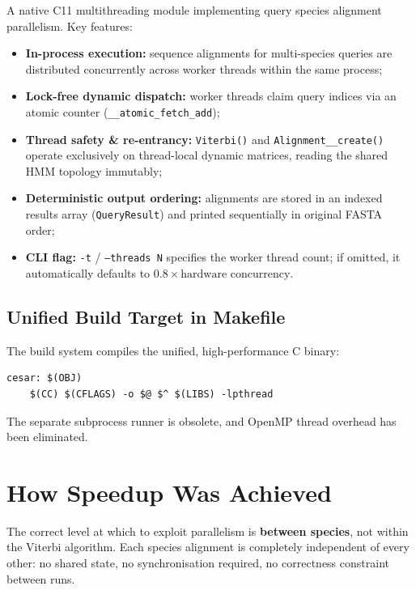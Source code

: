 \documentclass[12pt,a4paper]{article}
\begin{document}
A native C11 multithreading module implementing query species alignment parallelism.
Key features:
\begin{itemize}
  \item \textbf{In-process execution:} sequence alignments for multi-species queries are
        distributed concurrently across worker threads within the same process;
  \item \textbf{Lock-free dynamic dispatch:} worker threads claim query indices via an atomic
        counter (\texttt{\_\_atomic\_fetch\_add});
  \item \textbf{Thread safety \& re-entrancy:} \texttt{Viterbi()} and \texttt{Alignment\_\_create()}
        operate exclusively on thread-local dynamic matrices, reading the shared HMM topology immutably;
  \item \textbf{Deterministic output ordering:} alignments are stored in an indexed results array
        (\texttt{QueryResult}) and printed sequentially in original FASTA order;
  \item \textbf{CLI flag:} \texttt{-t} / \texttt{--threads N} specifies the worker thread count;
        if omitted, it automatically defaults to $0.8 \times \text{hardware concurrency}$.
\end{itemize}

\subsection{Unified Build Target in Makefile}

The build system compiles the unified, high-performance C binary:
\begin{lstlisting}
cesar: $(OBJ)
	$(CC) $(CFLAGS) -o $@ $^ $(LIBS) -lpthread
\end{lstlisting}
The separate subprocess runner is obsolete, and OpenMP thread overhead has been eliminated.


\section{How Speedup Was Achieved}

The correct level at which to exploit parallelism is \textbf{between species}, not
within the Viterbi algorithm. Each species alignment is completely independent of every
other: no shared state, no synchronisation required, no correctness constraint between
runs.
\end{document}
